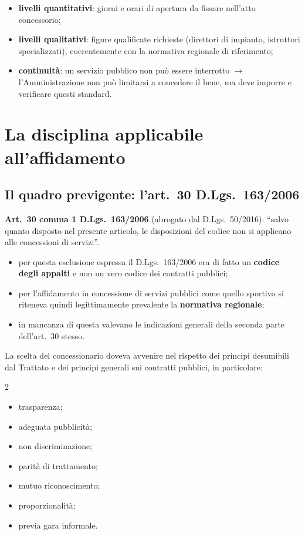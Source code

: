 \begin{itemize}
  \item \textbf{livelli quantitativi}: giorni e orari di apertura da fissare nell'atto
    concessorio;
  \item \textbf{livelli qualitativi}: figure qualificate richieste (direttori di impianto,
    istruttori specializzati), coerentemente con la normativa regionale di riferimento;
  \item \textbf{continuità}: un servizio pubblico non può essere interrotto $\rightarrow$
    l'Amministrazione non può limitarsi a concedere il bene, ma deve imporre e verificare questi
    standard.
\end{itemize}

\section{La disciplina applicabile all'affidamento}

\subsection{Il quadro previgente: l'art.\ 30 D.Lgs.\ 163/2006}

\textbf{Art.\ 30 comma 1 D.Lgs.\ 163/2006} (abrogato dal D.Lgs.\ 50/2016): ``salvo quanto disposto
nel presente articolo, le disposizioni del codice non si applicano alle concessioni di servizi''.

\begin{itemize}
  \item per questa esclusione espressa il D.Lgs.\ 163/2006 era di fatto un \textbf{codice degli
    appalti} e non un vero codice dei contratti pubblici;
  \item per l'affidamento in concessione di servizi pubblici come quello sportivo si riteneva
    quindi legittimamente prevalente la \textbf{normativa regionale};
  \item in mancanza di questa valevano le indicazioni generali della seconda parte dell'art.\ 30
    stesso.
\end{itemize}


La scelta del concessionario doveva avvenire nel rispetto dei principi desumibili dal Trattato e
dei principi generali sui contratti pubblici, in particolare:

\begin{multicols}{2}
\begin{itemize}
  \item trasparenza;
  \item adeguata pubblicità;
  \item non discriminazione;
  \item parità di trattamento;
  \item mutuo riconoscimento;
  \item proporzionalità;
  \item previa gara informale.
\end{itemize}
\end{multicols}

